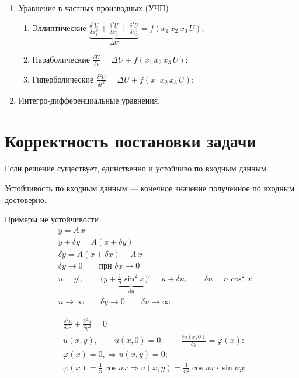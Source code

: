 \begin{enumerate}
	\item Уравнение в частных производных (УЧП)
	\begin{enumerate}
		\item Эллиптические $\underbrace{\frac{\delta^2 U}{\delta x_1^2} + \frac{\delta^2 U}{\delta x^2_2} + \frac{\delta^2 U}{\delta x^2_3}}_{\Delta U} = f(x_1\, x_2\, x_3\, U)$;
		\item Параболические $\displaystyle\frac{\delta U}{\delta t} = \Delta U + f(x_1\, x_2\, x_3\, U)$;
		\item Гиперболические $\displaystyle\frac{\delta^2 U}{\delta t^2} = \Delta U + f(x_1\, x_2\, x_3\, U)$;
	\end{enumerate}
	\item Интегро-дифференциальные уравнения.
\end{enumerate}



\section{Корректность постановки задачи}

\begin{defn}
	Если решение существует, единственно и устойчиво по входным данным.
\end{defn}

\begin{defn}
	Устойчивость по входным данным --- конечное значение полученное по входным достоверно.
\end{defn}

Примеры не устойчивости
\begin{align*}
	&y = A\,x 
	\\
	&y + \delta y = A(x + \delta y)
	\\
	&\delta y = A(x + \delta x) - A\,x
	\\
	&\delta y \to 0 \qquad \text{при } \delta x \to 0
	\\
	&u = y', \qquad \biggl(y + \underbrace{\frac{1}{n} \sin^2 x}_{\delta y}\biggr)' = u + \delta u, \qquad \delta u = n \cos^2 x
	\\
	&n \to \infty \qquad \delta y \to 0 \qquad \delta u \to \infty
\end{align*}

\begin{align*}
	&\frac{\delta^2 u}{\delta x^2} + \frac{\delta^2 u}{\delta y^2} = 0
	\\
	&u(x, y), \qquad u(x, 0) = 0, \qquad \frac{\delta u(x, 0)}{\delta y} = \varphi(x):
	\\
	&\varphi(x) = 0, \Rightarrow u(x, y) = 0;
	\\
	&\varphi(x) = \frac{1}{n}\cos nx \Rightarrow u(x, y) = \frac{1}{n^2}\cos nx \cdot \sin ny;
\end{align*}

